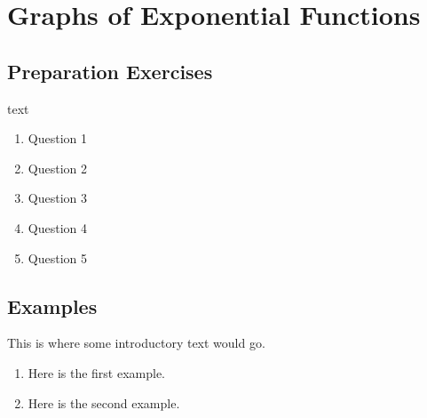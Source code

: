 

\section{Graphs of Exponential Functions} \label{exponential-graph}





\subsection*{Preparation Exercises} \label{prep-exponential-graph}

\begin{myPrep}
text

	\begin{enumerate}
		\item Question 1
		\vfill
		\item Question 2
		\vfill
		\item Question 3
		\vfill
		\item Question 4
		\vfill
		\item Question 5
		\vfill
	\end{enumerate}
\end{myPrep}


\newpage


\subsection*{Examples} \label{examples-exponential-graph}

This is where some introductory text would go.

\begin{myExample}
\begin{enumerate}

\item Here is the first example.
\vfill

\item Here is the second example.
\vfill

\end{enumerate}
\end{myExample}


